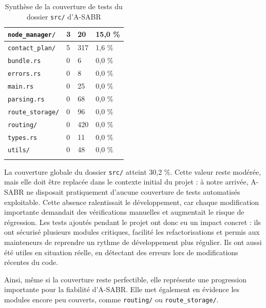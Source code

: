 \documentclass{article}
\begin{document}
\begin{center}
\begin{longtable}{|p{}|p{}|p{}|p{}|}
\texttt{node\_manager/} & 3 & 20 & 15,0 \% \\
\hline

\texttt{contact\_plan/} & 5 & 317 & 1,6 \% \\
\hline

\texttt{bundle.rs} & 0 & 6 & 0,0 \% \\
\hline

\texttt{errors.rs} & 0 & 8 & 0,0 \% \\
\hline

\texttt{main.rs} & 0 & 25 & 0,0 \% \\
\hline

\texttt{parsing.rs} & 0 & 68 & 0,0 \% \\
\hline

\texttt{route\_storage/} & 0 & 96 & 0,0 \% \\
\hline

\texttt{routing/} & 0 & 420 & 0,0 \% \\
\hline

\texttt{types.rs} & 0 & 11 & 0,0 \% \\
\hline

\texttt{utils/} & 0 & 48 & 0,0 \% \\
\hline

\caption{Synthèse de la couverture de tests du dossier \texttt{src/} d'A-SABR}
\label{tab:coverage-src-asabr}
\end{longtable}

\end{center}

La couverture globale du dossier \texttt{src/} atteint 30,2 \%. Cette valeur reste modérée, mais elle doit être replacée dans le contexte initial du projet : à notre arrivée, A-SABR ne disposait pratiquement d’aucune couverture de tests automatisés exploitable. Cette absence ralentissait le développement, car chaque modification importante demandait des vérifications manuelles et augmentait le risque de régression. Les tests ajoutés pendant le projet ont donc eu un impact concret : ils ont sécurisé plusieurs modules critiques, facilité les refactorisations et permis aux mainteneurs de reprendre un rythme de développement plus régulier. Ils ont aussi été utiles en situation réelle, en détectant des erreurs lors de modifications récentes du code.

Ainsi, même si la couverture reste perfectible, elle représente une progression importante pour la fiabilité d’A-SABR. Elle met également en évidence les modules encore peu couverts, comme \texttt{routing/} ou \texttt{route\_storage/}.
\end{document}
